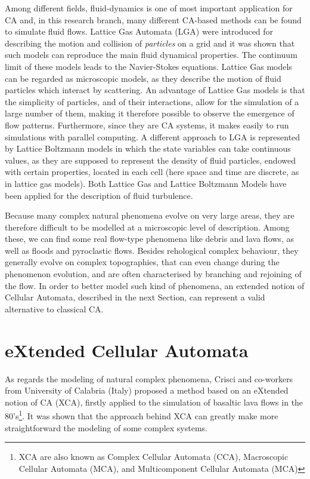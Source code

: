 Among different fields, fluid-dynamics is one of most important
application for CA and, in this research branch, many different
CA-based methods can be found to simulate fluid flows.  Lattice Gas
Automata (LGA) were introduced for describing the motion and collision of
\emph{particles} on a grid and it was shown that such models can
reproduce the main fluid dynamical properties. The continuum limit of
these models leads to the Navier-Stokes equations. Lattice Gas models
can be regarded as microscopic models, as they describe the motion of
fluid particles which interact by scattering. An advantage of Lattice
Gas models is that the simplicity of particles, and of their
interactions, allow for the simulation of a large number of them,
making it therefore possible to observe the emergence of flow
patterns. Furthermore, since they are CA systems, it makes easily to
run simulations with parallel computing. A different approach to LGA
is represented by Lattice Boltzmann models in which the state
variables can take continuous values, as they are supposed to
represent the density of fluid particles, endowed with certain
properties, located in each cell (here space and time are discrete, as
in lattice gas models). Both Lattice Gas and Lattice Boltzmann Models
have been applied for the description of fluid turbulence.

Because many complex natural phenomena evolve on very large areas,
they are therefore difficult to be modelled at a microscopic level of
description. Among these, we can find some real flow-type phenomena
like debris and lava flows, as well as floods and pyroclastic
flows. Besides rehological complex behaviour, they generally evolve on
complex topographies, that can even change during the phenomenon
evolution, and are often characterised by branching and rejoining of
the flow. In order to better model such kind of phenomena, an extended
notion of Cellular Automata, described in the next Section, can
represent a valid alternative to classical CA.

\section{eXtended Cellular Automata}

As regards the modeling of natural complex phenomena, Crisci and
co-workers from University of Calabria (Italy) proposed a method based
on an eXtended notion of CA (XCA), firstly applied to the simulation
of basaltic lava flows in the 80's\footnote{XCA are also known as
  Complex Cellular Automata (CCA), Macroscopic Cellular Automata
  (MCA), and Multicomponent Cellular Automata (MCA)}. It was shown
that the approach behind XCA can greatly make more straightforward the
modeling of some complex systems.

